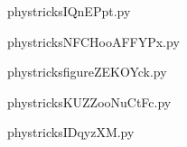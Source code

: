     

    \clearpage
    


    \newcommand{\CaptionFigIQnEPpt}{<+Type your caption here+>}
    \begin{center}
        
    \end{center}
    phystricksIQnEPpt.py

    

    \clearpage
    


    \newcommand{\CaptionFigNFCHooAFFYPx}{<+Type your caption here+>}
    \begin{center}
        
    \end{center}
    phystricksNFCHooAFFYPx.py

    

    \clearpage
    


    \newcommand{\CaptionFigfigureZEKOYck}{<+Type your caption here+>}
    \begin{center}
        
    \end{center}
    phystricksfigureZEKOYck.py

    

    \clearpage
    


    \newcommand{\CaptionFigKUZZooNuCtFc}{<+Type your caption here+>}
    \begin{center}
        
    \end{center}
    phystricksKUZZooNuCtFc.py

    

    \clearpage
    


    \newcommand{\CaptionFigIDqyzXM}{<+Type your caption here+>}
    \begin{center}
        
    \end{center}
    phystricksIDqyzXM.py

    

    \clearpage
    


